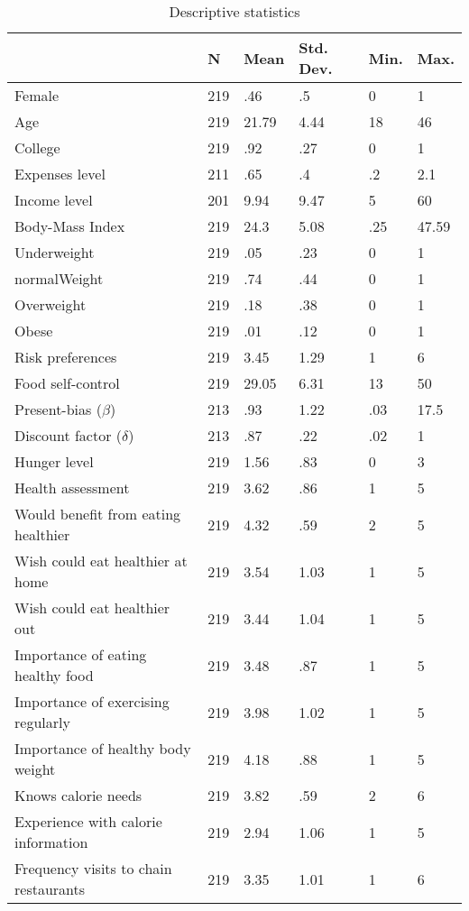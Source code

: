 \begin{table}[h] \centering
{}

\caption{Descriptive statistics}
\label{tab:descriptiveStatistics}
\begin{tabularx}{\linewidth}{lCCCCC}

\toprule
{}&{N}&{Mean}&{Std. Dev.}&{Min.}&{Max.} \tabularnewline
\midrule \addlinespace[\belowrulesep]
Female&219&.46&.5&0&1 \tabularnewline
Age&219&21.79&4.44&18&46 \tabularnewline
College&219&.92&.27&0&1 \tabularnewline
Expenses level&211&.65&.4&.2&2.1 \tabularnewline
Income level&201&9.94&9.47&5&60 \tabularnewline
Body-Mass Index&219&24.3&5.08&.25&47.59 \tabularnewline
Underweight&219&.05&.23&0&1 \tabularnewline
normalWeight&219&.74&.44&0&1 \tabularnewline
Overweight&219&.18&.38&0&1 \tabularnewline
Obese&219&.01&.12&0&1 \tabularnewline
\midrule Risk preferences&219&3.45&1.29&1&6 \tabularnewline
Food self-control&219&29.05&6.31&13&50 \tabularnewline
Present-bias (\(\beta\))&213&.93&1.22&.03&17.5 \tabularnewline
Discount factor (\(\delta\))&213&.87&.22&.02&1 \tabularnewline
Hunger level&219&1.56&.83&0&3 \tabularnewline
\midrule Health assessment&219&3.62&.86&1&5 \tabularnewline
Would benefit from eating healthier&219&4.32&.59&2&5 \tabularnewline
Wish could eat healthier at home&219&3.54&1.03&1&5 \tabularnewline
Wish could eat healthier out&219&3.44&1.04&1&5 \tabularnewline
Importance of eating healthy food&219&3.48&.87&1&5 \tabularnewline
Importance of exercising regularly&219&3.98&1.02&1&5 \tabularnewline
Importance of healthy body weight&219&4.18&.88&1&5 \tabularnewline
\midrule Knows calorie needs&219&3.82&.59&2&6 \tabularnewline
Experience with calorie information&219&2.94&1.06&1&5 \tabularnewline
Frequency visits to chain restaurants&219&3.35&1.01&1&6 \tabularnewline
\bottomrule 

\end{tabularx}
\end{table}
